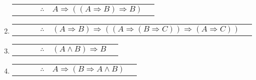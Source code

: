 \documentclass[12pt]{report}
\theoremstyle{largebreak}
\newcounter{tablec}
\begin{document}
\begin{sol}
\begin{enumerate}
\begin{center}
                \setcounter{tablec}{1}
                \begin{tabular}{l r l c l r}
                    \hline
                    & & & $\therefore$ & $A\Rightarrow ((A\Rightarrow B)\Rightarrow B)$ & \\
                \end{tabular}
            \end{center}
            \item
            \begin{center}
                \begin{tabular}{l r l c l r}
                    \hline
                    & & & $\therefore$ & $(A\Rightarrow B)\Rightarrow((A\Rightarrow (B\Rightarrow C))\Rightarrow(A\Rightarrow C))$ & \\
                \end{tabular}
            \end{center}
            \item
            \begin{center}
                \setcounter{tablec}{1}
                \begin{tabular}{l r l c l r}
                    \hline
                    & & & $\therefore$ & $(A\land B)\Rightarrow B$ & \\
                \end{tabular}
            \end{center}
            \item
            \begin{center}
                \setcounter{tablec}{1}
                \begin{tabular}{l r l c l r}
                    \hline
                    & & & $\therefore$ & $A\Rightarrow(B\Rightarrow A\land B)$ & \\
                \end{tabular}
            \end{center}
        \end{enumerate}
    \end{sol}
\end{document}
